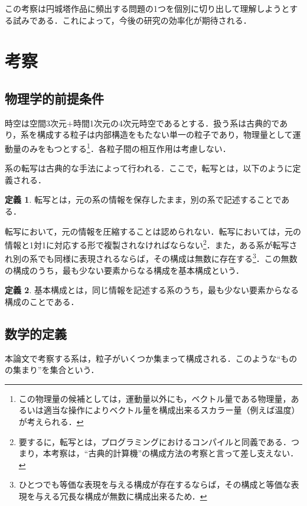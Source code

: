 \documentclass[10pt, a5paper, twoside]{jsarticle}
\theoremstyle{definition}
\newtheorem{dfn}{定義}
\begin{document}
		この考察は円城塔作品に頻出する問題の1つを個別に切り出して理解しようとする試みである．これによって，今後の研究の効率化が期待される．

	\section{考察}

		\subsection{物理学的前提条件}

			時空は空間3次元$+$時間1次元の4次元時空であるとする．扱う系は古典的であり，系を構成する粒子は内部構造をもたない単一の粒子であり，物理量として運動量のみをもつとする\footnote{この物理量の候補としては，運動量以外にも，ベクトル量である物理量，あるいは適当な操作によりベクトル量を構成出来るスカラー量（例えば温度）が考えられる．}．各粒子間の相互作用は考慮しない．

			系の転写は古典的な手法によって行われる．ここで，転写とは，以下のように定義される．

			\begin{dfn}
			
				転写とは，元の系の情報を保存したまま，別の系で記述することである．
			
			\end{dfn}

			転写において，元の情報を圧縮することは認められない．転写においては，元の情報と1対1に対応する形で複製されなければならない\footnote{要するに，転写とは，プログラミングにおけるコンパイルと同義である．つまり，本考察は，“古典的計算機”の構成方法の考察と言って差し支えない．}．また，ある系が転写され別の系でも同様に表現されるならば，その構成は無数に存在する\footnote{ひとつでも等価な表現を与える構成が存在するならば，その構成と等価な表現を与える冗長な構成が無数に構成出来るため．}．この無数の構成のうち，最も少ない要素からなる構成を基本構成という．

			\begin{dfn}

				基本構成とは，同じ情報を記述する系のうち，最も少ない要素からなる構成のことである．
			
			\end{dfn}

		\subsection{数学的定義}

			本論文で考察する系は，粒子がいくつか集まって構成される．このような“ものの集まり”を集合という．
\end{document}
